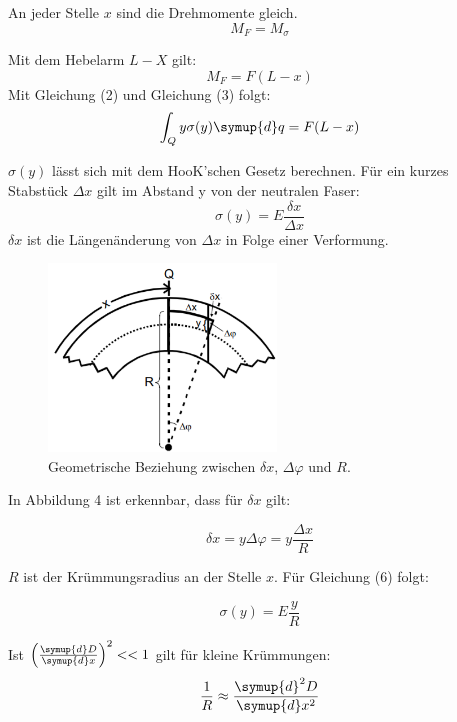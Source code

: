 An jeder Stelle $x$ sind die Drehmomente gleich.
\begin{equation}
  M_F =M_{\sigma}
\end{equation}

Mit dem Hebelarm $L-X$ gilt:
\begin{equation}
  M_F = F(L - x)
\end{equation}
Mit Gleichung (2) und Gleichung (3) folgt:
\begin{equation}
  \int_Q y \sigma(y) \symup{d}q = F(L - x)
\end{equation}

$\sigma (y)$ lässt sich mit dem HooK'schen Gesetz berechnen.
Für ein kurzes Stabstück $\Delta x$ gilt im Abstand y von der neutralen Faser:
\begin{equation}
  \sigma (y) = E \frac{\delta x}{\Delta x}
\end{equation}
$\delta x$ ist die Längenänderung von $\Delta x$ in Folge einer Verformung.

\begin{figure}[H]
  \centering
  \includegraphics[height=5cm]{deltax.PNG}
  \caption{Geometrische Beziehung zwischen $\delta x$, $\Delta\varphi$ und $R$. \cite{sample}}
  \label{fig:deltax}
\end{figure}

In Abbildung 4 ist erkennbar, dass für $\delta x$ gilt:

\begin{equation}
  \delta x = y \Delta \varphi = y \frac{\Delta x}{R}
\end{equation}

$R$ ist der Krümmungsradius an der Stelle $x$. Für Gleichung (6) folgt:

\begin{equation}
  \sigma (y) = E \frac{y}{R}
\end{equation}

Ist $\left(\frac{\symup{d} D}{\symup{d} x}\right)^2 << 1$ gilt für kleine Krümmungen:
\begin{equation}
  \frac{1}{R} \approx \frac{\symup{d}^2 D}{\symup{d} x^2}
\end{equation}

